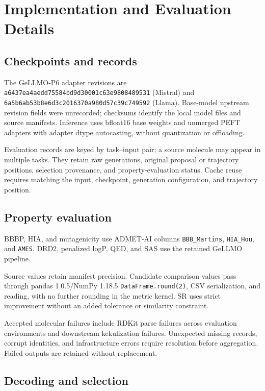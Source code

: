 \section{Implementation and Evaluation Details}
\label{app:implementation}

\subsection{Checkpoints and records}
The GeLLMO-P6 adapter revisions are \nolinkurl{a6437ea4aedd75584bd9d30001c63e9808489531} (Mistral) and \nolinkurl{6a5b6ab53b8e6d3c2016370a980d57c39c749592} (Llama). Base-model upstream revision fields were unrecorded; checksums identify the local model files and source manifests. Inference uses bfloat16 base weights and unmerged PEFT adapters with adapter dtype autocasting, without quantization or offloading.

Evaluation records are keyed by task--input pair; a source molecule may appear in multiple tasks. They retain raw generations, original proposal or trajectory positions, selection provenance, and property-evaluation status. Cache reuse requires matching the input, checkpoint, generation configuration, and trajectory position.

\subsection{Property evaluation}
BBBP, HIA, and mutagenicity use ADMET-AI \citep{admet2024} columns \texttt{BBB\_Martins}, \texttt{HIA\_Hou}, and \texttt{AMES}. DRD2, penalized logP, QED, and SAS use the retained GeLLMO pipeline.

Source values retain manifest precision. Candidate comparison values pass through pandas 1.0.5/NumPy 1.18.5 \texttt{DataFrame.round(2)}, CSV serialization, and reading, with no further rounding in the metric kernel. SR uses strict improvement without an added tolerance or similarity constraint.

Accepted molecular failures include RDKit parse failures across evaluation environments and downstream kekulization failures. Unexpected missing records, corrupt identities, and infrastructure errors require resolution before aggregation. Failed outputs are retained without replacement.

\subsection{Decoding and selection}


